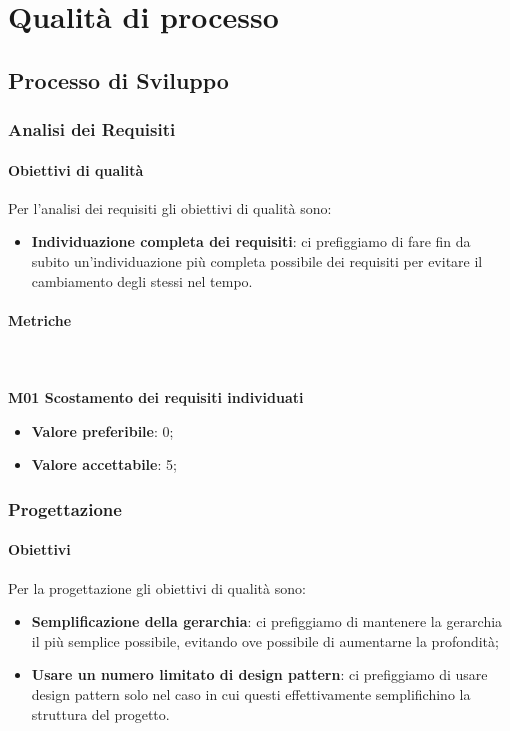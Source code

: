 \section{Qualità di processo}
												
	\subsection{Processo di Sviluppo}
		\subsubsection{Analisi dei Requisiti} 
			\paragraph{Obiettivi di qualità}
			Per l'analisi dei requisiti gli obiettivi di qualità sono:
			\begin{itemize}
				\item \textbf{Individuazione completa dei requisiti}: ci prefiggiamo di fare fin da subito un'individuazione più completa possibile dei requisiti per evitare il cambiamento degli stessi nel tempo.
			\end{itemize}
			\paragraph{Metriche} \mbox{} \\ \\
				\textbf{M01 Scostamento dei requisiti individuati} 
				\begin{itemize}
					\item \textbf{Valore preferibile}: 0;
					\item \textbf{Valore accettabile}: 5;
				\end{itemize}
			
		\subsubsection{Progettazione}
			\paragraph{Obiettivi}
			 Per la progettazione gli obiettivi di qualità sono:
			 \begin{itemize}
			 	\item \textbf{Semplificazione della gerarchia}: ci prefiggiamo di mantenere la gerarchia il più semplice possibile, evitando ove possibile di aumentarne la profondità;
			 	\item \textbf{Usare un numero limitato di design pattern}: ci prefiggiamo di usare design pattern solo nel caso in cui questi effettivamente semplifichino la struttura del progetto.
			 \end{itemize}
